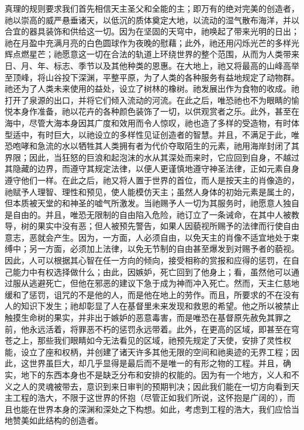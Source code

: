 真理的规则要求我们首先相信天主圣父和全能的主；即万有的绝对完美的创造者，祂以崇高的威严悬垂诸天，以低沉的质体奠定大地，以流动的湿气散布海洋，并以合宜的器具装饰和供给这一切。因为在坚固的天穹中，祂唤起了带来光明的日出；祂在月盈中充满月亮的白色圆球作为夜晚的慰藉；此外，祂还用闪烁光芒的多样光辉点燃星芒；祂愿意这一切在合法的轨道上环绕世界的整个范围，从而为人类带来日、月、年、标志、季节以及其他种类的恩惠。在大地上，祂又将最高的山峰高举至顶峰，将山谷投下深渊，平整平原，为了人类的各种服务有益地规定了动物群。祂还为了人类未来使用的益处，设立了树林的橡树。祂发展出作为食物的收成。祂打开了泉源的出口，并将它们倾入流动的河流。在此之后，唯恐祂也不为眼睛的愉悦本身作准备，祂以花卉的各种颜色装饰了一切，以供观赏者之乐。此外，甚至在海中，尽管大海本身因其广度和效用而令人惊叹，祂也造了多样的受造物，有时体型适中，有时巨大，以祂设立的多样性见证创造者的智慧。并且，不满足于此，唯恐咆哮和急流的水以牺牲其人类拥有者为代价夺取陌生的元素，祂用海岸封闭了其界限；因此，当狂怒的巨浪和起泡沫的水从其深处而来时，它应回到自身，不越过其隐藏的边界，而遵守其规定法律，以便人更谨慎地遵守神圣法律，正如元素自身遵守他们一样。在此之后，祂又将人置于世界的首位，而人是按天主的肖像造的，祂赋予人理智、理性和预见，使人能模仿天主；虽然人身体的初始元素是属土的，但本质被天堂的和神圣的嘘气所激发。当祂赐予人一切为其服务时，祂愿意人独自是自由的。并且，唯恐无限制的自由陷入危险，祂订立了一条诫命，在其中人被教导，树的果实中没有恶；但人被预先警告，如果人因藐视所赐予的法律而行使自由意志，恶就会产生。因为，一方面，人必须自由，以免天主的肖像不适宜地处于束缚中；另一方面，必须加上法律，以免无节制的自由甚至爆发到对赐予者的藐视。因此，人可以根据其心智在任一方向的倾向，接受相称的赏报和应得的惩罚，在自己能力中有权选择做什么；由此，因嫉妒，死亡回到了他身上；看，虽然他可以通过服从逃避死亡，但他在邪恶的建议下急于成为神而冲入死亡。然而，天主仁慈地缓和了惩罚，诅咒的不是他的人，而是他在地上的劳作。而且，所要求的不在没有人的知识下发生；祂却彰显了人在基督里未来发现和救恩的希望。他之所以被禁止触摸生命树的果实，并非出于嫉妒的恶意毒害，而是唯恐在基督原先赦免其罪之前，他永远活着，将罪恶不朽的惩罚永远带着。此外，在更高的区域，即甚至在穹苍之上，那些我们眼睛如今无法看见的区域，祂预先规定了天使，安排了灵性权能，设立了座和权柄，并创建了诸天许多其他无限的空间和祂奥迹的无界工程；因此，这世界虽巨大，却几乎显得是最后而不是唯一的有形之物的工程。并且，确实，地下的东西本身也不是缺乏分布和安排的权能的。因为有一个地方，义人和不义之人的灵魂被带去，意识到来日审判的预期判决；因此我们能在一切方向看到天主工程的浩大，不限于这世界的怀抱（尽管正如我们所说，这怀抱是广阔的），而且也能在世界本身的深渊和深处之下构想。如此，考虑到工程的浩大，我们应恰当地赞美如此结构的创造者。\par

